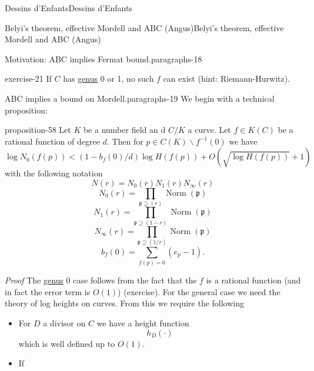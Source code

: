 \documentclass[10pt,]{book}
\makeatletter
\renewcommand*{\proofname}{Proof}
\renewenvironment{proof}[1][\proofname]{\par
  \pushQED{\qed}%
  \normalfont \topsep6\p@\@plus6\p@\relax
  \trivlist
  \item\relax
    {\itshape
    #1\@addpunct{.}}\hspace\labelsep\ignorespaces
}{%
  \popQED\endtrivlist\@endpefalse
}
\numberwithin{equation}{section}
\newcommand{\ideal}[1]{\mathfrak{#1}}
\newcommand{\inv}{^{-1}}
\DeclareMathOperator{\norm}{Norm}
\newcommand{\lt}{<}
\makeatother
\begin{document}
\begin{chapterptx}{Dessins d'Enfants}{}{Dessins d'Enfants}{}{}
\begin{sectionptx}{Belyi's theorem, effective Mordell and ABC (Angus)}{}{Belyi's theorem, effective Mordell and ABC (Angus)}{}{}
\begin{paragraphs}{Motivation: ABC implies Fermat bound.}{paragraphs-18}
\begin{inlineexercise}{}{exercise-21}
\hypertarget{p-685}{}%
If \(C\)  has \hyperref[def-class-set]{genus} 0 or 1, no such \(f\) can exist (hint: Riemann-Hurwitz).%
\end{inlineexercise}
\end{paragraphs}%
\begin{paragraphs}{ABC implies a bound on Mordell.}{paragraphs-19}%
\hypertarget{p-686}{}%
We begin with a technical proposition:%
\begin{proposition}{}{}{proposition-58}%
\hypertarget{p-687}{}%
Let \(K\) be a number field an d \(C/K\) a  curve. Let \(f \in K(C)\) be a rational function of degree \(d\). Then for \(p \in C(K) \smallsetminus f\inv(0)\) we have%
\begin{equation*}
\log N_0(f(p)) \lt (1- b_f(0)/d) \log H(f(p)) + O(\sqrt{\log H(f(p))} + 1)
\end{equation*}
with the following notation%
\begin{equation*}
N(r)  =N_0(r) N_1(r) N_\infty(r)
\end{equation*}
%
\begin{equation*}
N_0(r) = \prod_{\ideal p \supseteq (r)} \norm(\ideal p)
\end{equation*}
%
\begin{equation*}
N_1(r) = \prod_{\ideal p \supseteq (1-r)} \norm(\ideal p)
\end{equation*}
%
\begin{equation*}
N_\infty(r) = \prod_{\ideal p \supseteq (1/r)} \norm(\ideal p)
\end{equation*}
%
\begin{equation*}
b_f(0) = \sum_{f(p) = 0} (e_p - 1)\text{.}
\end{equation*}
%
\end{proposition}
\begin{proof}\hypertarget{proof-98}{}
\hypertarget{p-688}{}%
The \hyperref[def-class-set]{genus} 0 case follows from the fact that the \(f\) is a rational function (and in fact the error term is \(O(1)\)) (exercise). For the general case we need the theory of log heights on curves. From this we require the following\leavevmode%
\begin{itemize}[label=\textbullet]
\item{}For \(D\) a divisor on \(C\) we have  a height function%
\begin{equation*}
h_D(\cdot)
\end{equation*}
which is well defined up to  \(O(1)\).%
\item{}If%
\begin{equation*}

\end{equation*}
\end{itemize}
\end{proof}
\end{paragraphs}
\end{sectionptx}
\end{chapterptx}
\end{document}
